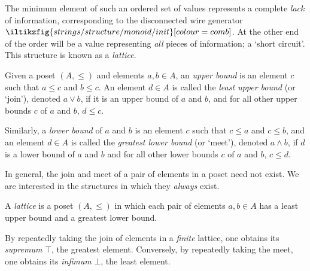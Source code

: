 The minimum element of such an ordered set of values represents a complete
\emph{lack} of information, corresponding to the disconnected wire generator \(
\iltikzfig{strings/structure/monoid/init}[colour=comb]
\).
At the other end of the order will be a value representing \emph{all} pieces of
information; a `short circuit'.
This structure is known as a \emph{lattice}.

\begin{definition}
    Given a poset \((A, \leq)\) and elements \(a, b\in A\), an
    \emph{upper bound} is an element \(c\) such that \(a \leq c\) and
    \(b \leq c\).
    An element \(d \in A\) is called the \emph{least upper bound} (or `join'),
    denoted \(a \vee b\), if it is an upper bound of \(a\) and \(b\), and for
    all other upper bounds \(c\) of \(a\) and \(b\), \(d \leq c\).

    Similarly, a \emph{lower bound} of \(a\) and \(b\) is an element \(c\) such
    that \(c \leq a\) and \(c \leq b\), and an element \(d \in A\) is called the
    \emph{greatest lower bound} (or `meet'), denoted \(a \wedge b\), if \(d\) is
    a lower bound of \(a\) and \(b\) and for all other lower bounds \(c\) of
    \(a\) and \(b\), \(c \leq d\).
\end{definition}

In general, the join and meet of a pair of elements in a poset need not exist.
We are interested in the structures in which they \emph{always} exist.

\begin{definition}[Lattice]
    A \emph{lattice} is a poset \((A, \leq)\) in which each pair of elements
    \(a,b \in A\) has a least upper bound and a greatest lower bound.
\end{definition}

By repeatedly taking the join of elements in a \emph{finite} lattice, one
obtains its \emph{supremum} \(\top\), the greatest element.
Conversely, by repeatedly taking the meet, one obtains its \emph{infimum}
\(\bot\), the least element.

